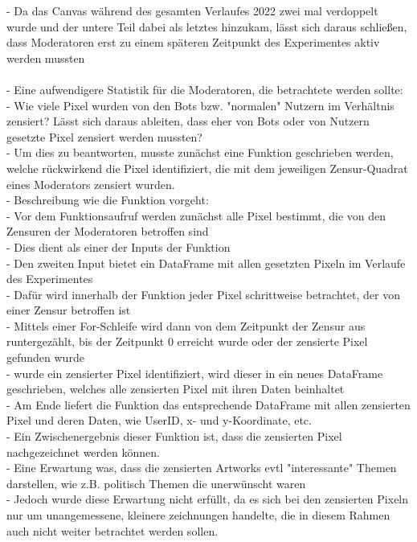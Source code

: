 {- Da das Canvas während des gesamten Verlaufes 2022 zwei mal verdoppelt wurde und der untere Teil dabei als letztes hinzukam, lässt sich daraus schließen, dass Moderatoren erst zu einem späteren Zeitpunkt des Experimentes aktiv werden mussten \\
\\
- Eine aufwendigere Statistik für die Moderatoren, die betrachtete werden sollte: \\
- Wie viele Pixel wurden von den Bots bzw. "normalen" Nutzern im Verhältnis zensiert? Lässt sich daraus ableiten, dass eher von Bots oder von Nutzern gesetzte Pixel zensiert werden mussten? \\
- Um dies zu beantworten, musste zunächst eine Funktion geschrieben werden, welche rückwirkend die Pixel identifiziert, die mit dem jeweiligen Zensur-Quadrat eines Moderators zensiert wurden. \\
- Beschreibung wie die Funktion vorgeht: \\
- Vor dem Funktionsaufruf werden zunächst alle Pixel bestimmt, die von den Zensuren der Moderatoren betroffen sind \\
- Dies dient als einer der Inputs der Funktion \\
- Den zweiten Input bietet ein DataFrame mit allen gesetzten Pixeln im Verlaufe des Experimentes \\
- Dafür wird innerhalb der Funktion jeder Pixel schrittweise betrachtet, der von einer Zensur betroffen ist\\
- Mittels einer For-Schleife wird dann von dem Zeitpunkt der Zensur aus runtergezählt, bis der Zeitpunkt 0 erreicht wurde oder der zensierte Pixel gefunden wurde \\
- wurde ein zensierter Pixel identifiziert, wird dieser in ein neues DataFrame geschrieben, welches alle zensierten Pixel mit ihren Daten beinhaltet \\
- Am Ende liefert die Funktion das entsprechende DataFrame mit allen zensierten Pixel und deren Daten, wie UserID, x- und y-Koordinate, etc.
\\
- Ein Zwischenergebnis dieser Funktion ist, dass die zensierten Pixel nachgezeichnet werden können. \\
- Eine Erwartung was, dass die zensierten Artworks evtl "interessante" Themen darstellen, wie z.B. politisch Themen die unerwünscht waren \\
- Jedoch wurde diese Erwartung nicht erfüllt, da es sich bei den zensierten Pixeln nur um unangemessene, kleinere zeichnungen handelte, die in diesem Rahmen auch nicht weiter betrachtet werden sollen. \\
}
